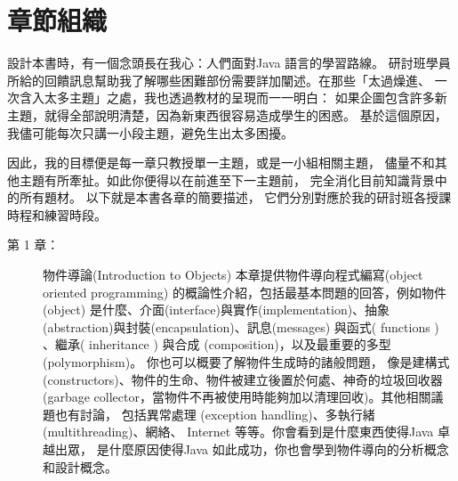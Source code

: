 \section{章節組織}
設計本書時，有一個念頭長在我心：人們面對Java 語言的學習路線。
研討班學員所給的回饋訊息幫助我了解哪些困難部份需要詳加闡述。在那些「太過燥進、
一次含入太多主題」之處，我也透過教材的呈現而一一明白：
如果企圖包含許多新主題，就得全部說明清楚，因為新東西很容易造成學生的困惑。
基於這個原因，我儘可能每次只講一小段主題，避免生出太多困擾。

因此，我的目標便是每一章只教授單一主題，或是一小組相關主題，
儘量不和其他主題有所牽扯。如此你便得以在前進至下一主題前，
完全消化目前知識背景中的所有題材。 以下就是本書各章的簡要描述，
它們分別對應於我的研討班各授課時程和練習時段。

\begin{description}
\item[第 1 章：] 物件導論(Introduction to Objects)
本章提供物件導向程式編寫(object oriented programming)
的概論性介紹，包括最基本問題的回答，例如物件(object)
是什麼、介面(interface)與實作(implementation)、抽象
(abstraction)與封裝(encapsulation)、訊息(messages)
與函式( functions ) 、繼承( inheritance ) 與合成
(composition)，以及最重要的多型(polymorphism)。
你也可以概要了解物件生成時的諸般問題， 像是建構式
(constructors)、物件的生命、物件被建立後置於何處、神奇的垃圾回收器
(garbage collector，當物件不再被使用時能夠加以清理回收)。其他相關議題也有討論，
包括異常處理 (exception handling)、多執行緒(multithreading)、網絡、
Internet 等等。你會看到是什麼東西使得Java 卓越出眾，
是什麼原因使得Java 如此成功，你也會學到物件導向的分析概念和設計概念。


\end{description}
